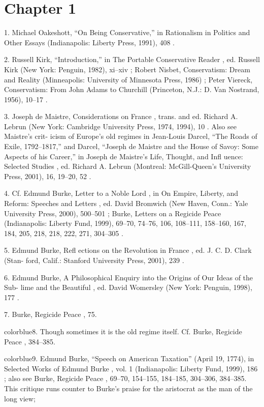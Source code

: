 \section{Chapter 1}


	{\color{blue}1}. Michael Oakeshott, “On Being Conservative,” in Rationalism in Politics and Other Essays (Indianapolis: Liberty Press, 1991), 408 .


	{\color{blue}2}. Russell Kirk, “Introduction,” in The Portable Conservative Reader , ed. Russell Kirk (New York: Penguin, 1982), xi–xiv ; Robert Nisbet, Conservatism: Dream and Reality (Minneapolis: University of Minnesota Press, 1986) ; Peter Viereck, Conservatism: From John Adams to Churchill (Princeton, N.J.: D. Van Nostrand, 1956), 10–17 .


	{\color{blue}3}. Joseph de Maistre, Considerations on France , trans. and ed. Richard A. Lebrun (New York: Cambridge University Press, 1974, 1994), 10 . Also see Maistre’s crit- icism of Europe’s old regimes in Jean-Louis Darcel, “The Roads of Exile, 1792–1817,” and Darcel, “Joseph de Maistre and the House of Savoy: Some Aspects of his Career,” in Joseph de Maistre’s Life, Thought, and Infl uence: Selected Studies , ed. Richard A. Lebrun (Montreal: McGill-Queen’s University Press, 2001), 16, 19–20, 52 .


	{\color{blue}4}. Cf. Edmund Burke, Letter to a Noble Lord , in On Empire, Liberty, and Reform: Speeches and Letters , ed. David Bromwich (New Haven, Conn.: Yale University Press, 2000), 500–501 ; Burke, Letters on a Regicide Peace (Indianapolis: Liberty Fund, 1999), 69–70, 74–76, 106, 108–111, 158–160, 167, 184, 205, 218, 218, 222, 271, 304–305 .


	{\color{blue}5}. Edmund Burke, Refl ections on the Revolution in France , ed. J. C. D. Clark (Stan- ford, Calif.: Stanford University Press, 2001), 239 .


	{\color{blue}6}. Edmund Burke, A Philosophical Enquiry into the Origins of Our Ideas of the Sub- lime and the Beautiful , ed. David Womersley (New York: Penguin, 1998), 177 .


	{\color{blue}7}. Burke, Regicide Peace , 75.


	{color{blue}8}. Though sometimes it is the old regime itself. Cf. Burke, Regicide Peace , 384–385.


	{color{blue}9}. Edmund Burke, “Speech on American Taxation” (April 19, 1774), in Selected Works of Edmund Burke , vol. 1 (Indianapolis: Liberty Fund, 1999), 186 ; also see Burke, Regicide Peace , 69–70, 154–155, 184–185, 304–306, 384–385. This critique runs counter to Burke’s praise for the aristocrat as the man of the long view;


